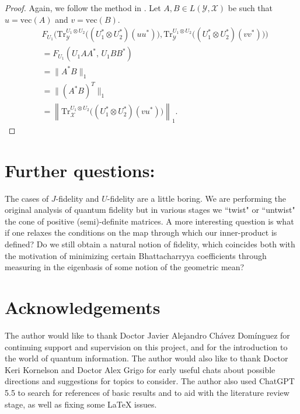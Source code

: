 \documentclass{amsart}
\numberwithin{equation}{section}
\theoremstyle{definition}
\theoremstyle{plain}
\theoremstyle{solutionstyle}
\begin{document}
\begin{proof} Again, we follow the method in \cite{Watrous_2018}.
Let $A,B \in L(\mathcal{Y},\mathcal{X})$ be such that $u=\mathrm{vec}(A)$ and $v=\mathrm{vec}(B)$.
\begin{align*}
&F_{U_1}\Big(
\mathrm{Tr}_{\mathcal{Y}}^{U_1 \otimes U_2}\big((U^*_1 \otimes U^*_2)(uu^*)\big),
\mathrm{Tr}_{\mathcal{Y}}^{U_1 \otimes U_2}\big((U_1^* \otimes U_2^*)(vv^*)\big)
\Big) \\
&= F_{U_1}(U_1A A^*,\, U_1 B B^*) \\
&= \|A^* B\|_1 \\
&= \|(A^* B)^T\|_1 \\
&= \left\|\mathrm{Tr}_{\mathcal{X}}^{U_1 \otimes U_2}\big((U_1^* \otimes U^*_2)(v u^*)\big)\right\|_1.
\end{align*}
\end{proof}
\section{Further questions:}
The cases of $J$-fidelity and $U$-fidelity are a little boring. We are performing the original analysis of quantum fidelity but in various stages we ``twist" or ``untwist" the cone of positive (semi)-definite matrices. A more interesting question is what if one relaxes the conditions on the map through which our inner-product is defined? Do we still obtain a natural notion of fidelity, which coincides both with the motivation of minimizing certain Bhattacharryya coefficients through measuring in the eigenbasis of some notion of the geometric mean?
\section*{Acknowledgements}
The author would like to thank Doctor Javier Alejandro Ch\'avez Dom\'inguez for continuing support and supervision on this project, and for the introduction to the world of quantum information. The author would also like to thank Doctor Keri Kornelson and Doctor Alex Grigo for early useful chats about possible directions and suggestions for topics to consider. The author also used ChatGPT 5.5 to search for references of basic results and to aid with the literature review stage, as well as fixing some LaTeX issues. 
\nocite{bhatia2009positive}
\nocite{bhatia2013matrix}
\nocite{johnston2021advanced}
\nocite{*}


\end{document}
